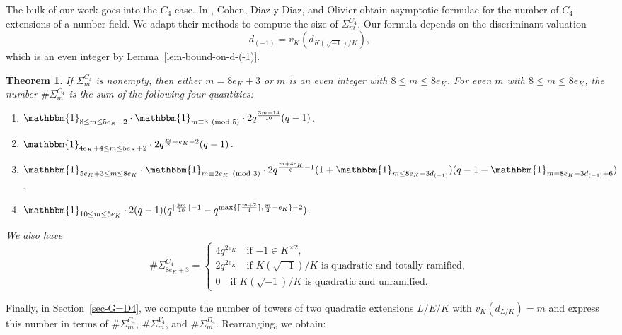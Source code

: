 \documentclass[11pt]{amsart}
\theoremstyle{theorem}
\newtheorem{theorem}{Theorem}
\theoremstyle{example}
\theoremstyle{definition}
\numberwithin{theorem}{section}
\numberwithin{theorem}{section}
\begin{document}
The bulk of our work goes into the $C_4$ case. In \cite{cohen-et-al}, Cohen, Diaz y Diaz, and Olivier obtain asymptotic formulae for the number of $C_4$-extensions of a number field. We adapt their methods to compute the size of $\Sigma_{m}^{C_4}$. Our formula depends on the discriminant valuation
$$
d_{(-1)} = v_K(d_{K(\sqrt{-1})/K}),
$$
which is an even integer by Lemma~\ref{lem-bound-on-d-(-1)}. 
\begin{theorem}
    \label{thm-size-Sigma-C4-m}
    If $\Sigma_{m}^{C_4}$ is nonempty, then either $m=8e_K + 3$ or $m$ is an even integer with $8 \leq m \leq 8e_K$. For even $m$ with $8 \leq m \leq 8e_K$, the number $\# \Sigma_{m}^{C_4}$ is the sum of the following four quantities:
    \begin{enumerate}
        \item $\mathbbm{1}_{8\leq m \leq 5e_K - 2}\cdot \mathbbm{1}_{m\equiv 3\pmod{5}}\cdot 2q^{\frac{3m-14}{10}}(q - 1)$.
        \item $\mathbbm{1}_{4e_K + 4 \leq m \leq 5e_K + 2}\cdot 2q^{\frac{m}{2}-e_K - 2}(q - 1)$.
        \item $\mathbbm{1}_{5e_K + 3 \leq m \leq 8e_K}\cdot \mathbbm{1}_{m\equiv 2e_K\pmod{3}}\cdot 2q^{\frac{m+4e_K}{6} - 1}(1 + \mathbbm{1}_{m \leq 8e_K - 3d_{(-1)}})(q - 1 - \mathbbm{1}_{m = 8e_K - 3d_{(-1)} + 6})$. 
        \item $\mathbbm{1}_{10 \leq m \leq 5e_K}\cdot 2(q-1)(
            q^{ \lfloor\frac{3m}{10} \rfloor - 1} - q^{\max\{
                \lceil \frac{m+2}{4}\rceil,
                 \frac{m}{2} - e_K
            \} - 2}
        )$.
    \end{enumerate}
    We also have 
    $$
    \#\Sigma_{8e_K + 3}^{C_4} = \begin{cases}
        4q^{2e_K}\quad\text{if $-1 \in K^{\times 2}$},
        \\
        2q^{2e_K} \quad\text{if $K(\sqrt{-1})/K$ is quadratic and totally ramified},
        \\
        0\quad\text{if $K(\sqrt{-1})/K$ is quadratic and unramified}.
    \end{cases}
    $$
\end{theorem}
Finally, in Section~\ref{sec-G=D4}, we compute the number of towers of two quadratic extensions $L/E/K$ with $v_K(d_{L/K}) = m$ and express this number in terms of $\#\Sigma_{m}^{C_4}$, $\#\Sigma_{m}^{V_4}$, and $\#\Sigma_{m}^{D_4}$. Rearranging, we obtain:
\end{document}
